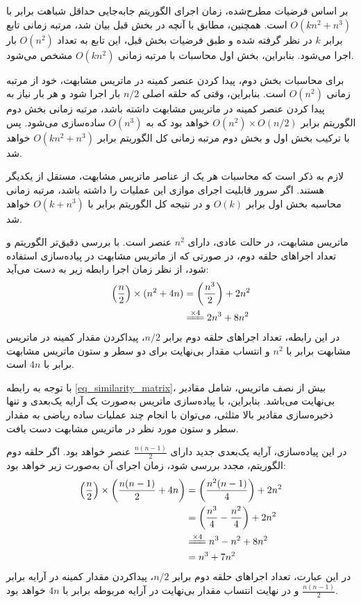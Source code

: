 بر اساس فرضیات مطرح‌شده، زمان اجرای الگوریتم جابه‌جایی حداقل شباهت برابر با \( O(kn^2 + n^3) \) است. همچنین، مطابق با آنچه در بخش قبل
بیان شد، مرتبه زمانی تابع
برابر
$k$
در نظر گرفته شده و طبق فرضیات بخش قبل، این تابع به تعداد \( O(n^2) \) بار اجرا می‌شود. بنابراین، بخش اول محاسبات با مرتبه زمانی \( O(kn^2) \) مشخص می‌شود.


برای محاسبات بخش دوم، پیدا کردن عنصر کمینه در ماتریس مشابهت، خود از مرتبه زمانی \(O(n^2)\) است. بنابراین، وقتی که حلقه اصلی \(n/2\) بار اجرا شود و هر بار نیاز به پیدا کردن عنصر کمینه در ماتریس مشابهت داشته باشد، مرتبه زمانی بخش دوم الگوریتم برابر \(O(n^2) \times O(n/2)\) خواهد بود که به \(O(n^3)\) ساده‌سازی می‌شود.
پس با ترکیب بخش اول و بخش دوم مرتبه زمانی کل الگوریتم برابر
\( O(kn^2 + n^3) \) 
خواهد شد.


لازم به ذکر است که محاسبات هر یک از عناصر ماتریس مشابهت، مستقل از یکدیگر هستند. اگر سرور قابلیت اجرای موازی این عملیات را داشته باشد، مرتبه زمانی محاسبه بخش اول برابر
\( O(k) \) 
و در نتیجه کل الگوریتم برابر با
\( O(k + n^3) \)
خواهد شد.

ماتریس مشابهت، در حالت عادی، دارای \(n^2\) عنصر است.
با بررسی دقیق‌تر الگوریتم و تعداد اجراهای حلقه دوم، در صورتی که از ماتریس مشابهت در پیاده‌سازی استفاده شود، از نظر زمان اجرا رابطه زیر به دست می‌آید:
\begin{equation}
	\begin{align*} 
		\left(\frac{n}{2}\right) \times (n^2 + 4n) &= \left(\frac{n^3}{2}\right)+2n^2 \\
		 &\xlongequal{\times 4} 2n^3 + 8n^2
	\end{align*}
\end{equation}
در این رابطه، تعداد اجراهای حلقه دوم برابر \(n/2\)، پیداکردن مقدار کمینه در ماتریس مشابهت برابر با \(n^2\) و انتساب مقدار بی‌نهایت برای دو سطر و ستون ماتریس مشابهت برابر با \(4n\) است.

با توجه به رابطه
\ref{eq_similarity_matrix}،
بیش از نصف ماتریس، شامل مقادیر بی‌نهایت می‌باشد. بنابراین، با پیاده‌سازی ماتریس به‌صورت یک آرایه یک‌بعدی و تنها ذخیره‌سازی مقادیر بالا مثلثی، می‌توان با انجام چند عملیات ساده ریاضی به مقدار سطر و ستون مورد نظر در ماتریس مشابهت دست یافت.

در این پیاده‌سازی، آرایه یک‌بعدی جدید دارای \(\frac{n(n-1)}{2}\) عنصر خواهد بود. اگر حلقه دوم الگوریتم، مجدد بررسی شود، زمان اجرای آن به‌صورت زیر خواهد بود:
\begin{equation}
	\begin{align*} 
		\left(\frac{n}{2}\right) \times \left(\frac{n(n-1)}{2} + 4n\right) &= \left(\frac{n^2(n-1)}{4} \right)+2n^2 \\
		&= \left(\frac{n^3}{4} - \frac{n^2}{4}\right) +2n^2 \\
		&\xlongequal{\times 4} n^3-n^2+8n^2 \\
		&= n^3+7n^2
	\end{align*}
\end{equation}
در این عبارت، تعداد اجراهای حلقه دوم برابر \(n/2\)، پیداکردن مقدار کمینه در آرایه برابر \(\frac{n(n-1)}{2}\) و در نهایت انتساب مقدار بی‌نهایت در آرایه مربوطه برابر با \(4n\) خواهد بود.

